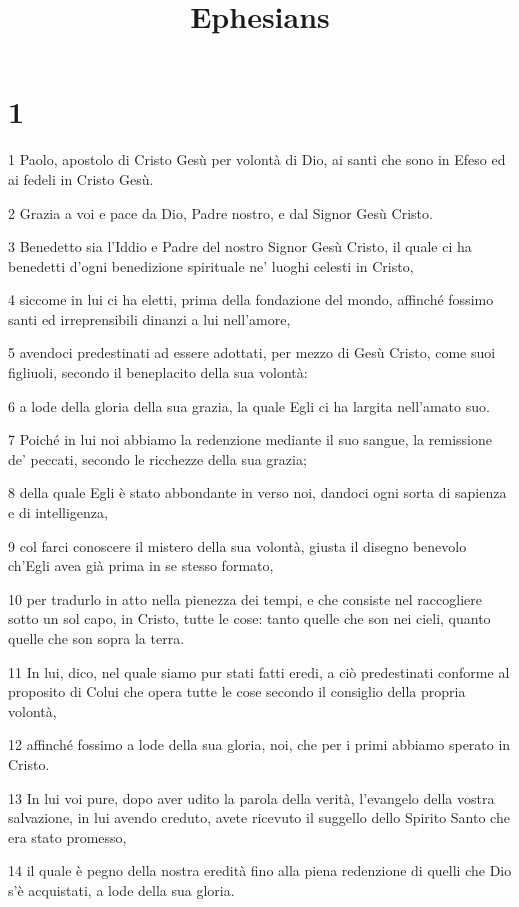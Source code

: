

\title{Ephesians}


\chapter{1}

\par 1 Paolo, apostolo di Cristo Gesù per volontà di Dio, ai santi che sono in Efeso ed ai fedeli in Cristo Gesù.
\par 2 Grazia a voi e pace da Dio, Padre nostro, e dal Signor Gesù Cristo.
\par 3 Benedetto sia l'Iddio e Padre del nostro Signor Gesù Cristo, il quale ci ha benedetti d'ogni benedizione spirituale ne' luoghi celesti in Cristo,
\par 4 siccome in lui ci ha eletti, prima della fondazione del mondo, affinché fossimo santi ed irreprensibili dinanzi a lui nell'amore,
\par 5 avendoci predestinati ad essere adottati, per mezzo di Gesù Cristo, come suoi figliuoli, secondo il beneplacito della sua volontà:
\par 6 a lode della gloria della sua grazia, la quale Egli ci ha largita nell'amato suo.
\par 7 Poiché in lui noi abbiamo la redenzione mediante il suo sangue, la remissione de' peccati, secondo le ricchezze della sua grazia;
\par 8 della quale Egli è stato abbondante in verso noi, dandoci ogni sorta di sapienza e di intelligenza,
\par 9 col farci conoscere il mistero della sua volontà, giusta il disegno benevolo ch'Egli avea già prima in se stesso formato,
\par 10 per tradurlo in atto nella pienezza dei tempi, e che consiste nel raccogliere sotto un sol capo, in Cristo, tutte le cose: tanto quelle che son nei cieli, quanto quelle che son sopra la terra.
\par 11 In lui, dico, nel quale siamo pur stati fatti eredi, a ciò predestinati conforme al proposito di Colui che opera tutte le cose secondo il consiglio della propria volontà,
\par 12 affinché fossimo a lode della sua gloria, noi, che per i primi abbiamo sperato in Cristo.
\par 13 In lui voi pure, dopo aver udito la parola della verità, l'evangelo della vostra salvazione, in lui avendo creduto, avete ricevuto il suggello dello Spirito Santo che era stato promesso,
\par 14 il quale è pegno della nostra eredità fino alla piena redenzione di quelli che Dio s'è acquistati, a lode della sua gloria.
